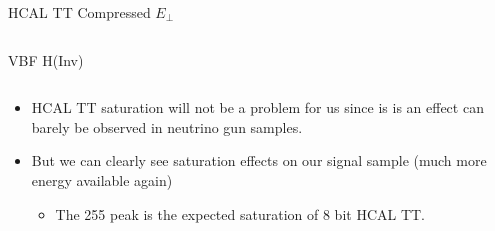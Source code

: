 \documentclass[8pt]{beamer}
\begin{document}
\begin{frame}{HCAL TT Compressed $E_{\perp}$}
\begin{columns}
\begin{block}{VBF H(Inv)}
\end{block}

\end{columns}

\begin{tiny}

\begin{itemize}
  \item HCAL TT saturation will not be a problem for us since is is an effect can barely be observed in neutrino gun samples.
  \item But we can clearly see saturation effects on our signal sample (much more energy available again) 
  \begin{itemize}
    \tiny
    \item The 255 peak is the expected saturation of 8 bit HCAL TT.
  \end{itemize}
\end{itemize}

\end{tiny}

\end{frame}
\end{document}
